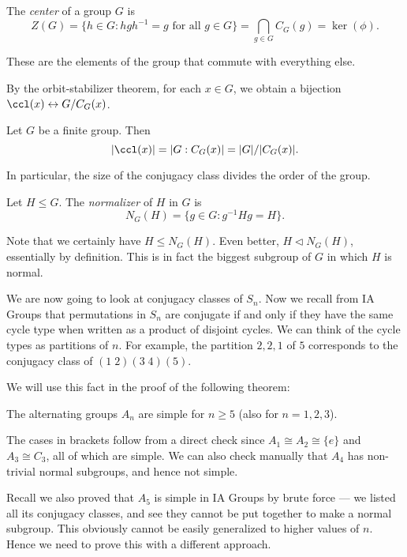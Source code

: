 \documentclass[a4paper]{article}
\begin{document}
\begin{defi}[Center]
  The \emph{center} of a group $G$ is
  \[
    Z(G) = \{h \in G: hg h^{-1} = g\text{ for all }g \in G\} = \bigcap_{g \in G} C_G(g) = \ker (\phi).
  \]
\end{defi}
These are the elements of the group that commute with everything else.

By the orbit-stabilizer theorem, for each $x \in G$, we obtain a bijection $\ccl(x) \leftrightarrow G/C_G(x)$.
\begin{prop}
  Let $G$ be a finite group. Then
  \[
    |\ccl(x)| = |G:C_G(x)| = |G|/|C_G(x)|.
  \]
\end{prop}
In particular, the size of the conjugacy class divides the order of the group.

\begin{defi}[Normalizer]
  Let $H \leq G$. The \emph{normalizer} of $H$ in $G$ is
  \[
    N_G(H) = \{g \in G: g^{-1}H g = H\}.
  \]
\end{defi}
Note that we certainly have $H \leq N_G(H)$. Even better, $H \lhd N_G(H)$, essentially by definition. This is in fact the biggest subgroup of $G$ in which $H$ is normal.

We are now going to look at conjugacy classes of $S_n$. Now we recall from IA Groups that permutations in $S_n$ are conjugate if and only if they have the same cycle type when written as a product of disjoint cycles. We can think of the cycle types as partitions of $n$. For example, the partition $2, 2, 1$ of $5$ corresponds to the conjugacy class of $(1\; 2)(3\; 4)(5)$.

We will use this fact in the proof of the following theorem:
\begin{thm}
  The alternating groups $A_n$ are simple for $n \geq 5$ (also for $n = 1, 2, 3$).
\end{thm}
The cases in brackets follow from a direct check since $A_1 \cong A_2 \cong \{e\}$ and $A_3 \cong C_3$, all of which are simple. We can also check manually that $A_4$ has non-trivial normal subgroups, and hence not simple.

Recall we also proved that $A_5$ is simple in IA Groups by brute force --- we listed all its conjugacy classes, and see they cannot be put together to make a normal subgroup. This obviously cannot be easily generalized to higher values of $n$. Hence we need to prove this with a different approach.
\end{document}
